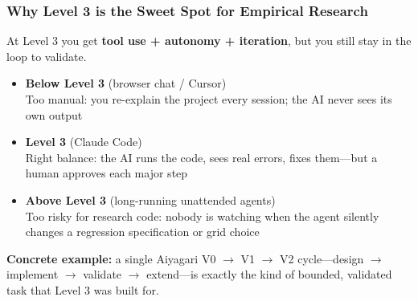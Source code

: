 \documentclass[10pt,english,aspectratio=169]{beamer}
\begin{document}
\begin{frame}
\frametitle{Why Level 3 is the Sweet Spot for Empirical Research}

At Level 3 you get \textbf{tool use + autonomy + iteration}, but you still stay in the loop to validate.

\vspace{0.3cm}

\begin{itemize}
    \item \textbf{Below Level 3} (browser chat / Cursor) \\
    Too manual: you re-explain the project every session; the AI never sees its own output
    \vspace{0.15cm}
    \item \textbf{Level 3} (Claude Code) \\
    Right balance: the AI runs the code, sees real errors, fixes them---but a human approves each major step
    \vspace{0.15cm}
    \item \textbf{Above Level 3} (long-running unattended agents) \\
    Too risky for research code: nobody is watching when the agent silently changes a regression specification or grid choice
\end{itemize}

\vspace{0.3cm}

\textbf{Concrete example:} a single Aiyagari V0 $\to$ V1 $\to$ V2 cycle---design $\to$ implement $\to$ validate $\to$ extend---is exactly the kind of bounded, validated task that Level 3 was built for.
\end{frame}
\end{document}
